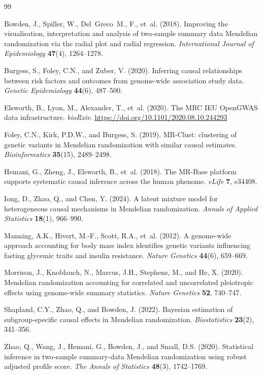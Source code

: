 \documentclass[12pt,a4paper]{article}
\begin{document}
\newpage

\begin{thebibliography}{99}

Bowden, J., Spiller, W., Del~Greco~M., F., et~al. (2018).
Improving the visualisation, interpretation and analysis of two-sample
summary data Mendelian randomization via the radial plot and radial
regression.
\textit{International Journal of Epidemiology} \textbf{47}(4), 1264--1278.

Burgess, S., Foley, C.N., and Zuber, V. (2020).
Inferring causal relationships between risk factors and outcomes from
genome-wide association study data.
\textit{Genetic Epidemiology} \textbf{44}(6), 487--500.

Elsworth, B., Lyon, M., Alexander, T., et~al. (2020).
The MRC IEU OpenGWAS data infrastructure.
\textit{bioRxiv}. \url{https://doi.org/10.1101/2020.08.10.244293}

Foley, C.N., Kirk, P.D.W., and Burgess, S. (2019).
MR-Clust: clustering of genetic variants in Mendelian randomization with
similar causal estimates.
\textit{Bioinformatics} \textbf{35}(15), 2489--2498.

Hemani, G., Zheng, J., Elsworth, B., et~al. (2018).
The MR-Base platform supports systematic causal inference across the
human phenome. \textit{eLife} \textbf{7}, e34408.

Iong, D., Zhao, Q., and Chen, Y. (2024).
A latent mixture model for heterogeneous causal mechanisms in Mendelian
randomization.
\textit{Annals of Applied Statistics} \textbf{18}(1), 966--990.

Manning, A.K., Hivert, M.-F., Scott, R.A., et~al. (2012).
A genome-wide approach accounting for body mass index identifies genetic
variants influencing fasting glycemic traits and insulin resistance.
\textit{Nature Genetics} \textbf{44}(6), 659--669.

Morrison, J., Knoblauch, N., Marcus, J.H., Stephens, M., and He, X. (2020).
Mendelian randomization accounting for correlated and uncorrelated pleiotropic
effects using genome-wide summary statistics.
\textit{Nature Genetics} \textbf{52}, 740--747.

Shapland, C.Y., Zhao, Q., and Bowden, J. (2022).
Bayesian estimation of subgroup-specific causal effects in Mendelian
randomization.
\textit{Biostatistics} \textbf{23}(2), 341--356.

Zhao, Q., Wang, J., Hemani, G., Bowden, J., and Small, D.S. (2020).
Statistical inference in two-sample summary-data Mendelian randomization
using robust adjusted profile score.
\textit{The Annals of Statistics} \textbf{48}(3), 1742--1769.

\end{thebibliography}
\end{document}
